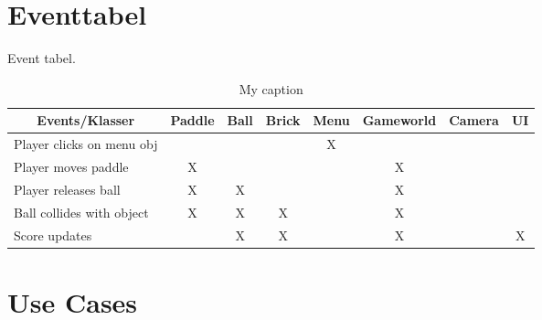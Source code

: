 \section{Eventtabel}
Event tabel.
\begin{table}[]
\centering
\caption{My caption}
\label{my-label}
\begin{tabular}{l|ccccccc}
\multicolumn{1}{c}{Events/Klasser} & Paddle & Ball & Brick & Menu & Gameworld & Camera & UI \\ \hline
Player clicks on menu obj &                            &                          &                           & X                        &                               &                            &                        \\
Player moves paddle          & X                          &                          &                           &                          & X                             &                            &                        \\
Player releases ball         & X                          & X                        &                           &                          & X                             &                            &                        \\
Ball collides with object    & X                          & X                        & X                         &                          & X                             &                            &                        \\
Score updates                &                            & X                        & X                         &                          & X                             &                            & X                     
\end{tabular}
\end{table}

\section{Use Cases}